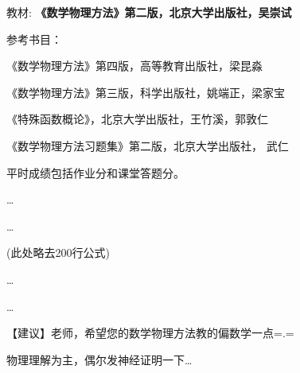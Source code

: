 \documentclass[CJK]{beamer}
\date{}
\begin{document}


\begin{frame}
\bch
{}
\ech
\end{frame}


\begin{frame}
\bch
教材:
{\bf \blue《数学物理方法》第二版，北京大学出版社，吴崇试}

\skiplines

参考书目：
\bitem
\item{《数学物理方法》第四版，高等教育出版社，梁昆淼}  
\item{《数学物理方法》第三版，科学出版社，姚端正，梁家宝}
\item{《特殊函数概论》，北京大学出版社，王竹溪，郭敦仁}
\item{《数学物理方法习题集》第二版，北京大学出版社， 武仁}
  \eitem
\ech
\end{frame}


\begin{frame}
\bch
{}

平时成绩包括作业分和课堂答题分。

\ech
\end{frame}

\begin{frame}
  \bch

  
  \ldots

  \ldots  

  (此处略去200行公式)
  
  \ldots

  \ldots
  
【建议】老师，希望您的数学物理方法教的偏数学一点=.= \\

  
  \ech
\end{frame}


\begin{frame}
  \bch

  {\Large 物理理解为主，偶尔发神经证明一下…}


  
  
  \ech
\end{frame}
\end{document}
